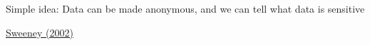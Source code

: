 \documentclass{beamer}
\def\vf{\vfill}
\begin{document}
\begin{frame}

Simple idea: Data can be made anonymous, and we can tell what data is sensitive

\end{frame}
\begin{frame}

\begin{center}
\end{center}

\vf
\href{http://dx.doi.org/10.1142/S0218488502001648}{Sweeney (2002)}

\end{frame}
\end{document}
